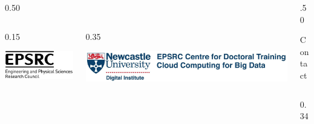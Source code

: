 \documentclass[final]{beamer}
\newlength{\colwidth}
\begin{document}
\begin{frame}[t]
\begin{columns}[t]
\begin{column}{\colwidth}
\begin{columns}[t]
\begin{column}{0.50\colwidth}
      \begin{columns}[t] %
        \begin{column}{0.15\colwidth}

          \includegraphics[width=0.95\linewidth]{sponsor-bwhighres.jpg}

        \end{column}%

        \begin{column}{0.35\colwidth}

          \includegraphics[width=0.95\linewidth]{CDT_CCBD2.jpg}

        \end{column}%

      \end{columns}

    \end{column}%

    \begin{column}{.50\colwidth}

      \begin{alertblock}{Contact}

        \begin{columns}[t] %
          \begin{column}{0.34\colwidth}


\end{column}
\end{columns}
\end{alertblock}
\end{column}
\end{columns}
\end{column}
\end{columns}
\end{frame}
\end{document}

